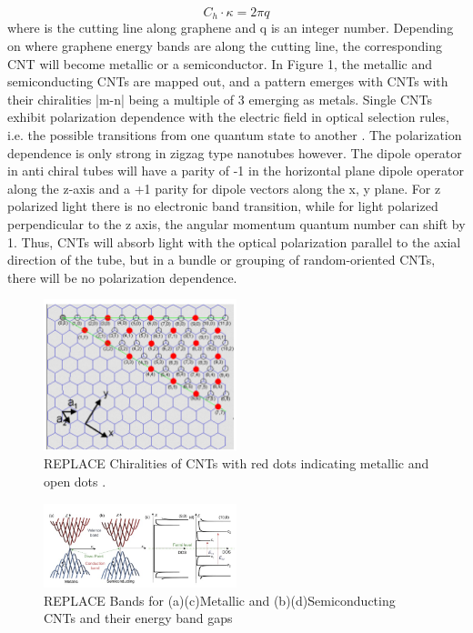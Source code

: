 \begin{equation}
	C_h\cdot\kappa = 2\pi q
\end{equation}
where  is the cutting line along graphene and q is an integer number.
Depending on where graphene energy bands are along the cutting line, the corresponding CNT will become metallic or a semiconductor. In Figure 1, the metallic and semiconducting CNTs are mapped out, and a pattern emerges with CNTs with their chiralities |m-n| being a multiple of 3 emerging as metals.
Single CNTs exhibit polarization dependence with the electric field in optical selection rules, i.e. the possible transitions from one quantum state to another \cite{thomsen}. The polarization dependence is only strong in zigzag type nanotubes however. The dipole operator in anti chiral tubes will have a parity of -1 in the horizontal plane dipole operator along the z-axis and a +1 parity for dipole vectors along the x, y plane. For z polarized light there is no electronic band transition, while for light polarized perpendicular to the z axis, the angular momentum quantum number can shift by 1. Thus, CNTs will absorb light with the optical polarization parallel to the axial direction of the tube, but in a bundle or grouping of random-oriented CNTs, there will be no polarization dependence.

\begin{figure}[h]
	\centering
	\includegraphics[width=0.5\textwidth]{./Figures/CNTs/chiral.png}
	\caption{REPLACE Chiralities of CNTs with red dots indicating metallic and open dots  \cite{dresselhaus}. }
	\label{fig:chiralities}
\end{figure}

\begin{figure}[h]
	\centering
	\includegraphics[width=0.5\textwidth]{./Figures/CNTs/DOS.png}
	\caption { REPLACE Bands for (a)(c)Metallic and (b)(d)Semiconducting CNTs and their energy band gaps \cite{yamashita}}
	\label{fig:cnt dos}
\end{figure}
\clearpage

